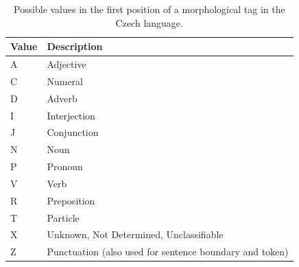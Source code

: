\begin{table}[t]
\centering
\begin{tabular}{| l | l |} 
\hline
    Value & Description \\
\hline
    A & Adjective \\
    C & Numeral \\
    D & Adverb \\
    I & Interjection \\
    J & Conjunction \\
    N & Noun \\
    P & Pronoun \\
    V & Verb \\
    R & Preposition \\
    T & Particle \\
    X & Unknown, Not  Determined, Unclassifiable \\
    Z & Punctuation (also used for sentence boundary and token) \\
\hline
\end{tabular}
\caption{Possible values in the first position of a morphological tag in the Czech language.}
\label{tab:czech-pos1}
\end{table}
